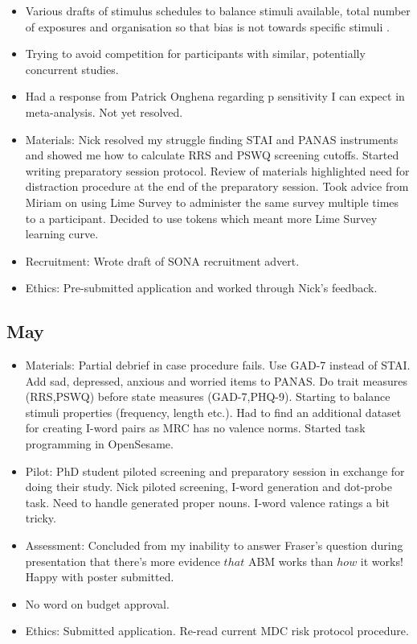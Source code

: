 \documentclass[british]{article}
\begin{document}
\begin{itemize}
  \item Various drafts of stimulus schedules to balance stimuli available,
    total number of exposures and organisation so that bias is not towards
    specific stimuli \parencite{see_reduction_2009}. 

  \item Trying to avoid competition for participants with similar, potentially concurrent
    studies.

  \item Had a response from Patrick Onghena regarding p sensitivity I can expect
    in meta-analysis. Not yet resolved.

  \item Materials: Nick resolved my struggle finding STAI and PANAS
  instruments and showed me how to calculate RRS and PSWQ screening
  cutoffs. Started writing preparatory session protocol. Review of
  materials highlighted need for distraction procedure at the end of the
  preparatory session. Took advice from Miriam on using Lime Survey to
  administer the same survey multiple times to a participant. Decided
  to use tokens which meant more Lime Survey learning curve.

  \item Recruitment: Wrote draft of SONA recruitment advert.

  \item Ethics: Pre-submitted application and worked through Nick's feedback.
\end{itemize}

\subsection{May}

\begin{itemize}
  \item Materials: Partial debrief in case procedure fails. Use GAD-7
  instead of STAI. Add sad, depressed, anxious and worried items to
  PANAS. Do trait measures (RRS,PSWQ) before state measures (GAD-7,PHQ-9).
  Starting to balance stimuli properties (frequency, length etc.). Had
  to find an additional dataset for creating I-word pairs as MRC has no
  valence norms. Started task programming in OpenSesame.

  \item Pilot: PhD student piloted screening and preparatory session
  in exchange for doing their study. Nick piloted screening, I-word
  generation and dot-probe task. Need to handle generated proper
  nouns. I-word valence ratings a bit tricky.

  \item Assessment: Concluded from my inability to answer Fraser's
  question during presentation that there's more evidence ${that}$ ABM
  works than ${how}$ it works! Happy with poster submitted.

  \item No word on budget approval.

  \item Ethics: Submitted application. Re-read current MDC risk protocol
    procedure.
\end{itemize}
\end{document}
